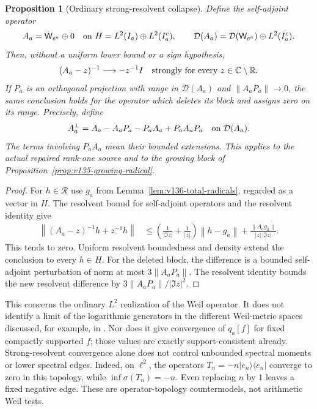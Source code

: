 \documentclass[11pt]{article}
\newtheorem{proposition}[theorem]{Proposition}
\theoremstyle{remark}
\newcommand{\norm}[1]{\left\lVert #1\right\rVert}
\begin{document}
\begin{proposition}[Ordinary strong-resolvent collapse]
\label{prop:v136-resolvent-collapse}
Define the self-adjoint operator
\[
 A_a=\mathsf W_{e^a}\oplus0
 \quad\hbox{on }H=L^2(I_a)\oplus L^2(I_a^c),
 \qquad
 \mathcal D(A_a)=\mathcal D(\mathsf W_{e^a})\oplus L^2(I_a^c).
\]
Then, without a uniform lower bound or a sign hypothesis,
\begin{equation}\label{eq:v136-resolvent-collapse}
 (A_a-z)^{-1}\longrightarrow-z^{-1}I
 \quad\hbox{strongly for every }z\in\mathbb C\setminus\mathbb R.
\end{equation}
If $P_a$ is an orthogonal projection with range in $\mathcal D(A_a)$
and $\norm{A_aP_a}\to0$, the same conclusion holds for the operator
which deletes its block and assigns zero on its range. Precisely, define
\[
 A_a^{\perp}=A_a-A_aP_a-P_aA_a+P_aA_aP_a
 \quad\hbox{on }\mathcal D(A_a).
\]
The terms involving $P_aA_a$ mean their bounded extensions.
This applies to the actual repaired rank-one source and to the growing
block of Proposition~\ref{prop:v135-growing-radical}.
\end{proposition}
\begin{proof}
For $h\in\mathcal R$ use $g_a$ from Lemma~\ref{lem:v136-total-radicals},
regarded as a vector in $H$. The resolvent bound for self-adjoint
operators and the resolvent identity give
\begin{align*}
 \norm{(A_a-z)^{-1}h+z^{-1}h}
 &\le\left(\frac1{|\Im z|}+\frac1{|z|}\right)\norm{h-g_a}
       +\frac{\norm{A_ag_a}}{|z|\,|\Im z|}.
\end{align*}
This tends to zero. Uniform resolvent boundedness and density extend
the conclusion to every $h\in H$. For the deleted block, the difference
is a bounded self-adjoint perturbation of norm at most
$3\norm{A_aP_a}$. The resolvent identity bounds the new resolvent
difference by $3\norm{A_aP_a}/|\Im z|^2$.
\end{proof}

This concerns the ordinary $L^2$ realization of the Weil operator.
It does not identify a limit of the logarithmic generators in the
different Weil-metric spaces discussed, for example, in
\cite[Section 7]{Suzuki2026}. Nor does it give convergence of
$q_a[f]$ for fixed compactly supported $f$; those values are exactly
support-consistent already. Strong-resolvent convergence alone does
not control unbounded spectral moments or lower spectral edges.
Indeed, on $\ell^2$, the operators
$T_n=-n|e_n\rangle\langle e_n|$ converge to zero in this topology,
while $\inf\sigma(T_n)=-n$. Even replacing $n$ by $1$ leaves a
fixed negative edge. These are operator-topology countermodels,
not arithmetic Weil tests.
\end{document}
